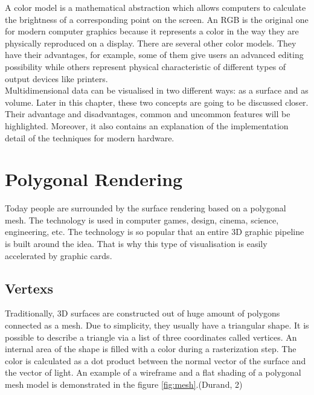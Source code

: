 \documentclass[twoside, english, 11pt]{report}
\begin{document}
A color model is a mathematical abstraction which allows computers to calculate the brightness of a corresponding point on the screen. An RGB is the original one for modern computer graphics because it represents a color in the way they are physically reproduced on a display. There are several other color models. They have their advantages, for example, some of them give users an advanced editing possibility while others represent physical characteristic of different types of output devices like printers.\\

Multidimensional data can be visualised in two different ways: as a surface and as volume. Later in this chapter, these two concepts are going to be discussed closer. Their advantage and disadvantages, common and uncommon features will be highlighted. Moreover, it also contains an explanation of the implementation detail of the techniques for modern hardware.


\section{Polygonal Rendering}

Today people are surrounded by the surface rendering based on a polygonal mesh. The technology is used in computer games, design, cinema, science, engineering, etc. The technology is so popular that an entire 3D graphic pipeline is built around the idea. That is why this type of visualisation is easily accelerated by graphic cards.\\

\subsection{Vertexs}
Traditionally, 3D surfaces are constructed out of huge amount of polygons connected as a mesh. Due to simplicity, they usually have a triangular shape. It is possible to describe a triangle via a list of three coordinates called vertices. An internal area of the shape is filled with a color during a rasterization step. The color is calculated as a dot product between the normal vector of the surface and the vector of light. An example of a wireframe and a flat shading of a polygonal mesh model is demonstrated in the figure \ref{fig:mesh}.(Durand, 2)
\end{document}
